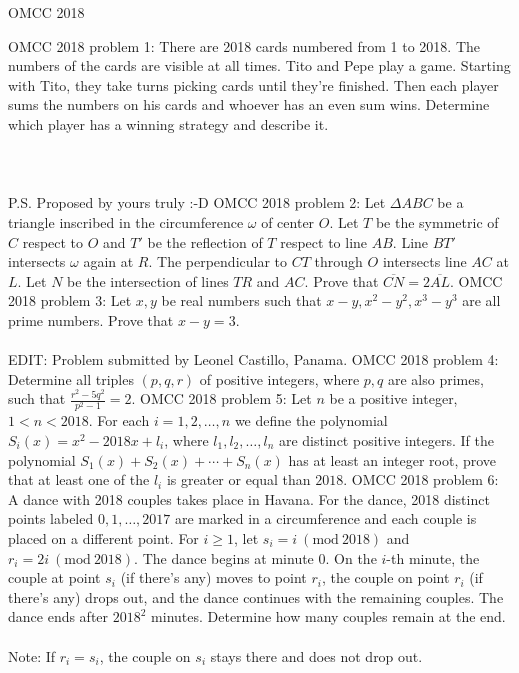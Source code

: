 OMCC 2018 

OMCC 2018 problem 1:  There are 2018 cards numbered from 1 to 2018. The numbers of the cards are visible at all times. Tito and Pepe play a game. Starting with Tito, they take turns picking cards until they're finished. Then each player sums the numbers on his cards and whoever has an even sum wins. Determine which player has a winning strategy and describe it. \\\\\\\\
P.S. Proposed by yours truly  :-D 
OMCC 2018 problem 2:  Let $\Delta ABC$ be a triangle inscribed in the circumference $\omega$ of center $O$. Let $T$ be the symmetric of $C$ respect to $O$ and $T'$ be the reflection of $T$ respect to line $AB$. Line $BT'$ intersects $\omega$ again at $R$. The perpendicular to $CT$ through $O$ intersects line $AC$ at $L$. Let $N$ be the intersection of lines $TR$ and $AC$. Prove that $\overline{CN}=2\overline{AL}$. 
OMCC 2018 problem 3:  Let $x, y$ be real numbers such that $x-y, x^2-y^2, x^3-y^3$ are all prime numbers. Prove that $x-y=3$. \\\\
EDIT: Problem submitted by Leonel Castillo, Panama. 
OMCC 2018 problem 4:  Determine all triples $(p, q, r)$ of positive integers, where $p, q$ are also primes, such that $\frac{r^2-5q^2}{p^2-1}=2$. 
OMCC 2018 problem 5:  Let $n$ be a positive integer, $1<n<2018$. For each $i=1, 2, \ldots ,n$ we define the polynomial $S_i(x)=x^2-2018x+l_i$, where $l_1, l_2, \ldots, l_n$ are distinct positive integers. If the polynomial $S_1(x)+S_2(x)+\cdots+S_n(x)$ has at least an integer root, prove that at least one of the $l_i$ is greater or equal than $2018$. 
OMCC 2018 problem 6:  A dance with 2018 couples takes place in Havana. For the dance, 2018 distinct points labeled $0, 1,\ldots, 2017$ are marked in a circumference and each couple is placed on a different point. For $i\geq1$, let $s_i=i\ (\textrm{mod}\ 2018)$ and $r_i=2i\ (\textrm{mod}\ 2018)$. The dance begins at minute $0$. On the $i$-th minute, the couple at point $s_i$ (if there's any) moves to point $r_i$, the couple on point $r_i$ (if there's any) drops out, and the dance continues with the remaining couples. The dance ends after $2018^2$ minutes. Determine how many couples remain at the end. \\\\
Note: If $r_i=s_i$, the couple on $s_i$ stays there and does not drop out. 

